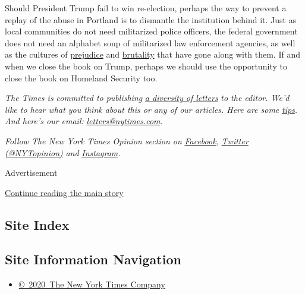 Should President Trump fail to win re-election, perhaps the way to
prevent a replay of the abuse in Portland is to dismantle the
institution behind it. Just as local communities do not need militarized
police officers, the federal government does not need an alphabet soup
of militarized law enforcement agencies, as well as the cultures of
\href{https://www.propublica.org/article/secret-border-patrol-facebook-group-agents-joke-about-migrant-deaths-post-sexist-memes}{prejudice}
and
\href{https://www.aclu.org/issues/immigrants-rights/ice-and-border-patrol-abuses}{brutality}
that have gone along with them. If and when we close the book on Trump,
perhaps we should use the opportunity to close the book on Homeland
Security too.

\emph{The Times is committed to publishing}
\href{https://www.nytimes.com/2019/01/31/opinion/letters/letters-to-editor-new-york-times-women.html}{\emph{a
diversity of letters}} \emph{to the editor. We'd like to hear what you
think about this or any of our articles. Here are some}
\href{https://help.nytimes.com/hc/en-us/articles/115014925288-How-to-submit-a-letter-to-the-editor}{\emph{tips}}\emph{.
And here's our email:}
\href{mailto:letters@nytimes.com}{\emph{letters@nytimes.com}}\emph{.}

\emph{Follow The New York Times Opinion section on}
\href{https://www.facebook.com/nytopinion}{\emph{Facebook}}\emph{,}
\href{http://twitter.com/NYTOpinion}{\emph{Twitter (@NYTopinion)}}
\emph{and}
\href{https://www.instagram.com/nytopinion/}{\emph{Instagram}}\emph{.}

Advertisement

\protect\hyperlink{after-bottom}{Continue reading the main story}

\hypertarget{site-index}{%
\subsection{Site Index}\label{site-index}}

\hypertarget{site-information-navigation}{%
\subsection{Site Information
Navigation}\label{site-information-navigation}}

\begin{itemize}
\tightlist
\item
  \href{https://help.nytimes.com/hc/en-us/articles/115014792127-Copyright-notice}{©~2020~The
  New York Times Company}
\end{itemize}

